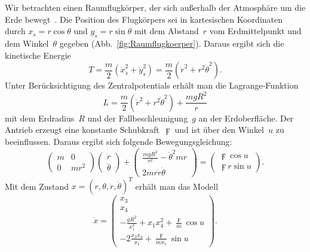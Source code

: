 \begin{example}
\label{exa:raumflugkoerper}Wir betrachten einen Raumflugkörper, der
sich außerhalb der Atmosphäre um die Erde bewegt~\cite[S.~193]{nijmeijer90}.
Die Position des Flugkörpers sei in kartesischen Koordinaten durch
$x_{s}=r\cos\theta$ und $y_{s}=r\sin\theta$ mit dem Abstand~$r$
vom Erdmittelpunkt und dem Winkel~$\theta$ gegeben (Abb.~\ref{fig:Raumflugkoerper}).
Daraus ergibt sich die kinetische Energie
\[
T=\frac{m}{2}\left(\dot{x}_{s}^{2}+\dot{y}_{s}^{2}\right)=\frac{m}{2}\left(\dot{r}^{2}+r^{2}\dot{\theta}^{2}\right).
\]
Unter Berücksichtigung des Zentralpotentials erhält man die Lagrange-Funktion
\[
L=\frac{m}{2}\left(\dot{r}^{2}+r^{2}\dot{\theta}^{2}\right)+\frac{mgR^{2}}{r}
\]
mit dem Erdradius~$R$ und der Fallbeschleunigung~$g$ an der Erdoberfläche.
Der Antrieb erzeugt eine konstante Schubkraft~$\digamma$ und ist
über den Winkel~$u$ zu beeinflussen. Daraus ergibt sich folgende
Bewegungsgleichung:
\[
\left(\begin{array}{cc}
m & 0\\
0 & mr^{2}
\end{array}\right)\left(\begin{array}{c}
\ddot{r}\\
\ddot{\theta}
\end{array}\right)+\left(\begin{array}{c}
\frac{mgR^{2}}{r^{2}}-\dot{\theta}^{2}mr\\
2mr\dot{r}\dot{\theta}
\end{array}\right)=\left(\begin{array}{c}
\digamma\cos u\\
\digamma r\sin u
\end{array}\right).
\]
Mit dem Zustand $x=(r,\theta,\dot{r},\dot{\theta})^{T}$ erhält man
das Modell
\begin{equation}
\dot{x}=\left(\begin{array}{c}
x_{3}\\
x_{4}\\
-\frac{gR^{2}}{x_{1}^{2}}+x_{1}x_{4}^{2}+\frac{\digamma}{m}\cos u\\
-2\frac{x_{3}x_{4}}{x_{1}}+\frac{\digamma}{mx_{1}}\sin u
\end{array}\right).\label{eq:Rakete-nichtaffin}
\end{equation}


\end{example}
